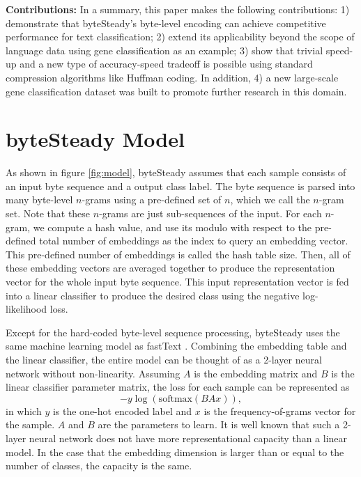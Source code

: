 \documentclass[sigconf,review, anonymous]{acmart}
\begin{document}
\textbf{Contributions:} In a summary, this paper makes the following contributions: 1) demonstrate that byteSteady's byte-level encoding can achieve competitive performance for text classification; 2) extend its applicability beyond the scope of language data using gene classification as an example; 3) show that trivial speed-up and a new type of accuracy-speed tradeoff is possible using standard compression algorithms like Huffman coding. In addition, 4) a new large-scale gene classification dataset was built to promote further research in this domain.

\section{byteSteady Model}

As shown in figure \ref{fig:model}, byteSteady assumes that each sample consists of an input byte sequence and a output class label. The byte sequence is parsed into many byte-level \(n\)-grams using a pre-defined set of \(n\), which we call the \(n\)-gram set. Note that these \(n\)-grams are just sub-sequences of the input. For each \(n\)-gram, we compute a hash value, and use its modulo with respect to the pre-defined total number of embeddings as the index to query an embedding vector. This pre-defined number of embeddings is called the hash table size. Then, all of these embedding vectors are averaged together to produce the representation vector for the whole input byte sequence. This input representation vector is fed into a linear classifier to produce the desired class using the negative log-likelihood loss.

Except for the hard-coded byte-level sequence processing, byteSteady uses the same machine learning model as fastText \cite{JGBM16}. Combining the embedding table and the linear classifier, the entire model can be thought of as a 2-layer neural network without non-linearity. Assuming \(A\) is the embedding matrix and \(B\) is the linear classifier parameter matrix, the loss for each sample can be represented as
\begin{equation}
\label{eq:loss}
-y \log(\mathrm{softmax}(BAx)),
\end{equation}
in which \(y\) is the one-hot encoded label and \(x\) is the frequency-of-grams vector for the sample. \(A\) and \(B\) are the parameters to learn. It is well known that such a 2-layer neural network does not have more representational capacity than a linear model. In the case that the embedding dimension is larger than or equal to the number of classes, the capacity is the same.
\end{document}
